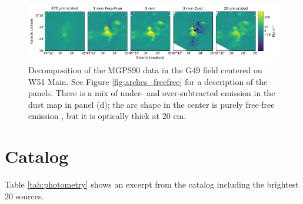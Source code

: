 \documentclass[twocolumn]{aastex62}
\begin{document}
\begin{figure}[htp]
    \includegraphics[width=17cm]{figures/G49_w51main_5panel.pdf}
    \caption{Decomposition of the MGPS90 data in the G49 field centered on W51 Main.
    See Figure \ref{fig:arches_freefree} for a description of the panels.
    There is a mix of under- and over-subtracted emission in the dust map in panel (d);
    the arc shape in the center is purely free-free emission \citep{Ginsburg2016a,Ginsburg2017a}, but
    it is optically thick at 20 cm.
}
\label{fig:w51mainfreefree}
\end{figure}

\section{Catalog}
\label{appendix:Catalog}
Table \ref{tab:photometry} shows an excerpt from the catalog including
the brightest 20 sources.






\end{document}
